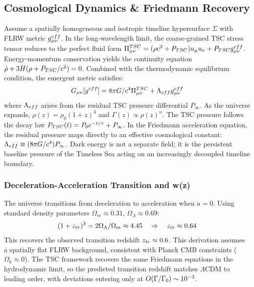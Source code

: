 \documentclass[11pt,a4paper]{article}
\def\frac#1#2{#1/#2} \def\phantom#1{} \def\ensuremath#1{#1}
\let\text\relax \let\mathrm\relax \let\mathbf\relax \let\mathcal\relax
\def\texorpdfstring#1#2{#2}
\begin{document}
\subsection{Cosmological Dynamics \& Friedmann Recovery}
Assume a spatially homogeneous and isotropic timeline hypersurface $\Sigma$ with FLRW metric $g_{\mu\nu}^{\text{eff}}$. In the long-wavelength limit, the coarse-grained TSC stress tensor reduces to the perfect fluid form $\Pi_{\mu\nu}^{\text{TSC}} = (\rho c^2 + P_{\text{TSC}}) u_\mu u_\nu + P_{\text{TSC}} g_{\mu\nu}^{\text{eff}}$. Energy-momentum conservation yields the continuity equation $\dot{\rho} + 3H(\rho + P_{\text{TSC}}/c^2) = 0$. Combined with the thermodynamic equilibrium condition, the emergent metric satisfies:
\begin{equation}
G_{\mu\nu}[g^{\text{eff}}] = \frac{8\pi G}{c^4} \Pi_{\mu\nu}^{\text{TSC}} + \Lambda_{\text{eff}} g_{\mu\nu}^{\text{eff}}
\end{equation}
where $\Lambda_{\text{eff}}$ arises from the residual TSC pressure differential $P_\infty$. As the universe expands, $\rho(z) = \rho_0 (1+z)^3$ and $\Gamma(z) \propto \rho(z)^n$. The TSC pressure follows the decay law $P_{\text{TSC}}(t) = P_0 e^{-t/\tau} + P_\infty$. In the Friedmann acceleration equation, the residual pressure maps directly to an effective cosmological constant: $\Lambda_{\text{eff}} \equiv (8\pi G/c^4) P_\infty$. Dark energy is not a separate field; it is the persistent baseline pressure of the Timeless Sea acting on an increasingly decoupled timeline boundary.

\subsubsection*{Deceleration-Acceleration Transition and \texorpdfstring{$w(z)$}{w(z)}}
The universe transitions from deceleration to acceleration when $\ddot{a} = 0$. Using standard density parameters $\Omega_m \approx 0.31$, $\Omega_\Lambda \approx 0.69$:
\begin{equation}
(1+z_{\text{tr}})^3 = \frac{2\Omega_\Lambda}{\Omega_m} \approx 4.45 \quad \Rightarrow \quad z_{\text{tr}} \approx 0.64
\end{equation}
This recovers the observed transition redshift $z_{\text{tr}} \approx 0.6$. This derivation assumes a spatially flat FLRW background, consistent with Planck CMB constraints ($\Omega_k \approx 0$). The TSC framework recovers the same Friedmann equations in the hydrodynamic limit, so the predicted transition redshift matches $\Lambda$CDM to leading order, with deviations entering only at $\mathcal{O}(\Gamma/\Gamma_0) \sim 10^{-3}$.
\end{document}
